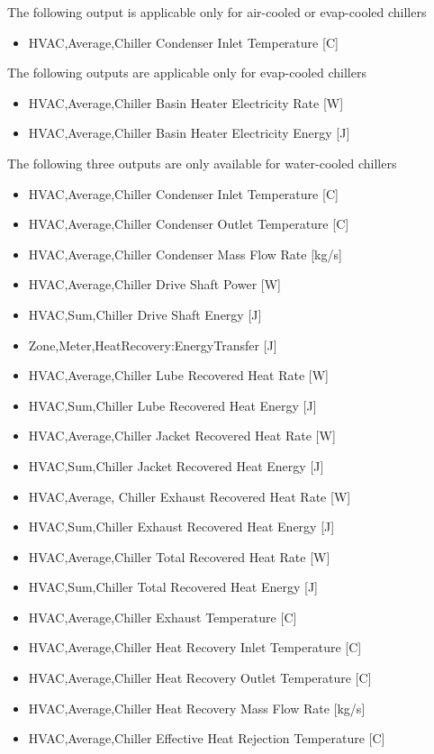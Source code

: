 The following output is applicable only for air-cooled or evap-cooled chillers

\begin{itemize}
    \tightlist
    \item
    HVAC,Average,Chiller Condenser Inlet Temperature {[}C{]}
\end{itemize}

The following outputs are applicable only for evap-cooled chillers

\begin{itemize}
    \item
    HVAC,Average,Chiller Basin Heater Electricity Rate {[}W{]}
    \item
    HVAC,Average,Chiller Basin Heater Electricity Energy {[}J{]}
\end{itemize}

The following three outputs are only available for water-cooled chillers

\begin{itemize}
    \item
    HVAC,Average,Chiller Condenser Inlet Temperature {[}C{]}
    \item
    HVAC,Average,Chiller Condenser Outlet Temperature {[}C{]}
    \item
    HVAC,Average,Chiller Condenser Mass Flow Rate {[}kg/s{]}
    \item
    HVAC,Average,Chiller Drive Shaft Power {[}W{]}
    \item
    HVAC,Sum,Chiller Drive Shaft Energy {[}J{]}
    \item
    Zone,Meter,HeatRecovery:EnergyTransfer {[}J{]}
    \item
    HVAC,Average,Chiller Lube Recovered Heat Rate {[}W{]}
    \item
    HVAC,Sum,Chiller Lube Recovered Heat Energy {[}J{]}
    \item
    HVAC,Average,Chiller Jacket Recovered Heat Rate {[}W{]}
    \item
    HVAC,Sum,Chiller Jacket Recovered Heat Energy {[}J{]}
    \item
    HVAC,Average, Chiller Exhaust Recovered Heat Rate {[}W{]}
    \item
    HVAC,Sum,Chiller Exhaust Recovered Heat Energy {[}J{]}
    \item
    HVAC,Average,Chiller Total Recovered Heat Rate {[}W{]}
    \item
    HVAC,Sum,Chiller Total Recovered Heat Energy {[}J{]}
    \item
    HVAC,Average,Chiller Exhaust Temperature {[}C{]}
    \item
    HVAC,Average,Chiller Heat Recovery Inlet Temperature {[}C{]}
    \item
    HVAC,Average,Chiller Heat Recovery Outlet Temperature {[}C{]}
    \item
    HVAC,Average,Chiller Heat Recovery Mass Flow Rate {[}kg/s{]}
    \item
    HVAC,Average,Chiller Effective Heat Rejection Temperature {[}C{]}
\end{itemize}

